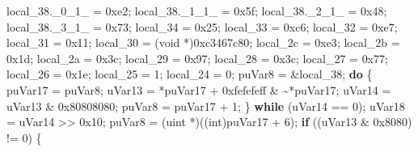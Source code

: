 \documentclass[
]{article}
\newenvironment{Shaded}{}{}
\newcommand{\BaseNTok}[1]{\textcolor[rgb]{0.25,0.63,0.44}{#1}}
\newcommand{\ControlFlowTok}[1]{\textcolor[rgb]{0.00,0.44,0.13}{\textbf{#1}}}
\newcommand{\DataTypeTok}[1]{\textcolor[rgb]{0.56,0.13,0.00}{#1}}
\newcommand{\DecValTok}[1]{\textcolor[rgb]{0.25,0.63,0.44}{#1}}
\newcommand{\NormalTok}[1]{#1}
\newcommand{\OperatorTok}[1]{\textcolor[rgb]{0.40,0.40,0.40}{#1}}
\begin{document}
\begin{Shaded}
\begin{Highlighting}[]
\NormalTok{  local\_38}\OperatorTok{.}\NormalTok{\_0\_1\_ }\OperatorTok{=} \BaseNTok{0xe2}\OperatorTok{;}
\NormalTok{  local\_38}\OperatorTok{.}\NormalTok{\_1\_1\_ }\OperatorTok{=} \BaseNTok{0x5f}\OperatorTok{;}
\NormalTok{  local\_38}\OperatorTok{.}\NormalTok{\_2\_1\_ }\OperatorTok{=} \BaseNTok{0x48}\OperatorTok{;}
\NormalTok{  local\_38}\OperatorTok{.}\NormalTok{\_3\_1\_ }\OperatorTok{=} \BaseNTok{0x73}\OperatorTok{;}
\NormalTok{  local\_34 }\OperatorTok{=} \BaseNTok{0x25}\OperatorTok{;}
\NormalTok{  local\_33 }\OperatorTok{=} \BaseNTok{0xc6}\OperatorTok{;}
\NormalTok{  local\_32 }\OperatorTok{=} \BaseNTok{0xe7}\OperatorTok{;}
\NormalTok{  local\_31 }\OperatorTok{=} \BaseNTok{0x11}\OperatorTok{;}
\NormalTok{  local\_30 }\OperatorTok{=} \OperatorTok{(}\DataTypeTok{void} \OperatorTok{*)}\BaseNTok{0xc3467c80}\OperatorTok{;}
\NormalTok{  local\_2c }\OperatorTok{=} \BaseNTok{0xe3}\OperatorTok{;}
\NormalTok{  local\_2b }\OperatorTok{=} \BaseNTok{0x1d}\OperatorTok{;}
\NormalTok{  local\_2a }\OperatorTok{=} \BaseNTok{0x3c}\OperatorTok{;}
\NormalTok{  local\_29 }\OperatorTok{=} \BaseNTok{0x97}\OperatorTok{;}
\NormalTok{  local\_28 }\OperatorTok{=} \BaseNTok{0x3c}\OperatorTok{;}
\NormalTok{  local\_27 }\OperatorTok{=} \BaseNTok{0x77}\OperatorTok{;}
\NormalTok{  local\_26 }\OperatorTok{=} \BaseNTok{0x1e}\OperatorTok{;}
\NormalTok{  local\_25 }\OperatorTok{=} \DecValTok{1}\OperatorTok{;}
\NormalTok{  local\_24 }\OperatorTok{=} \DecValTok{0}\OperatorTok{;}
\NormalTok{  puVar8 }\OperatorTok{=} \OperatorTok{\&}\NormalTok{local\_38}\OperatorTok{;}
  \ControlFlowTok{do} \OperatorTok{\{}
\NormalTok{    puVar17 }\OperatorTok{=}\NormalTok{ puVar8}\OperatorTok{;}
\NormalTok{    uVar13 }\OperatorTok{=} \OperatorTok{*}\NormalTok{puVar17 }\OperatorTok{+} \BaseNTok{0xfefefeff} \OperatorTok{\&} \OperatorTok{\textasciitilde{}*}\NormalTok{puVar17}\OperatorTok{;}
\NormalTok{    uVar14 }\OperatorTok{=}\NormalTok{ uVar13 }\OperatorTok{\&} \BaseNTok{0x80808080}\OperatorTok{;}
\NormalTok{    puVar8 }\OperatorTok{=}\NormalTok{ puVar17 }\OperatorTok{+} \DecValTok{1}\OperatorTok{;}
  \OperatorTok{\}} \ControlFlowTok{while} \OperatorTok{(}\NormalTok{uVar14 }\OperatorTok{==} \DecValTok{0}\OperatorTok{);}
\NormalTok{  uVar18 }\OperatorTok{=}\NormalTok{ uVar14 }\OperatorTok{\textgreater{}\textgreater{}} \BaseNTok{0x10}\OperatorTok{;}
\NormalTok{  puVar8 }\OperatorTok{=} \OperatorTok{(}\NormalTok{uint }\OperatorTok{*)((}\DataTypeTok{int}\OperatorTok{)}\NormalTok{puVar17 }\OperatorTok{+} \DecValTok{6}\OperatorTok{);}
  \ControlFlowTok{if} \OperatorTok{((}\NormalTok{uVar13 }\OperatorTok{\&} \BaseNTok{0x8080}\OperatorTok{)} \OperatorTok{!=} \DecValTok{0}\OperatorTok{)} \OperatorTok{\{}

\end{Highlighting}
\end{Shaded}
\end{document}
